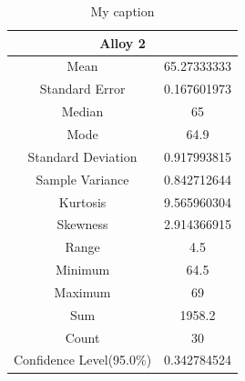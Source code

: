 \documentclass[letterpaper]{article}
\begin{document}
\begin{table}[H]
 \centering
 \begin{tabular}{|c|c|}
  \hline  \multicolumn{2}{|c|}{Alloy 2}  \\ \hline
  Mean                     & 65.27333333 \\ \hline
  Standard Error           & 0.167601973 \\ \hline
  Median                   & 65          \\ \hline
  Mode                     & 64.9        \\ \hline
  Standard Deviation       & 0.917993815 \\ \hline
  Sample Variance          & 0.842712644 \\ \hline
  Kurtosis                 & 9.565960304 \\ \hline
  Skewness                 & 2.914366915 \\ \hline
  Range                    & 4.5         \\ \hline
  Minimum                  & 64.5        \\ \hline
  Maximum                  & 69          \\ \hline
  Sum                      & 1958.2      \\ \hline
  Count                    & 30          \\ \hline
  Confidence Level(95.0\%) & 0.342784524 \\ \hline
 \end{tabular}
 \caption{My caption}
 \label{3a2}
\end{table}
\end{document}

